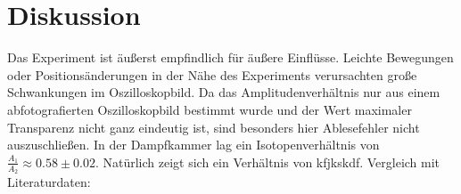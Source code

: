 \section{Diskussion}
\label{sec:Diskussion}
Das Experiment ist äußerst empfindlich für äußere Einflüsse. Leichte Bewegungen oder Positionsänderungen in der Nähe des Experiments verursachten große Schwankungen im Oszilloskopbild.
Da das Amplitudenverhältnis nur aus einem abfotografierten Oszilloskopbild bestimmt wurde und der Wert maximaler Transparenz nicht ganz eindeutig ist, sind besonders hier Ablesefehler nicht auszuschließen.
In der Dampfkammer lag ein Isotopenverhältnis von $\frac{A_1}{A_2}\approx 0.58\pm 0.02$. Natürlich zeigt sich ein Verhältnis von kfjkskdf.
Vergleich mit Literaturdaten:
